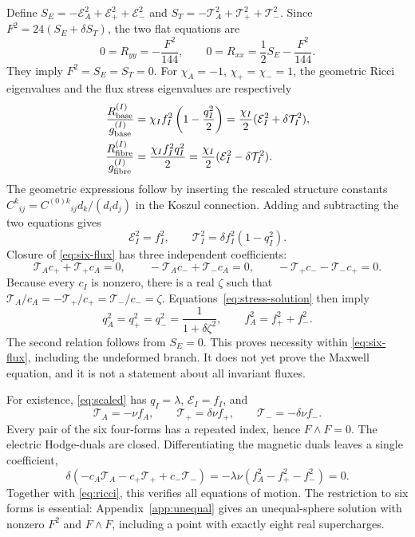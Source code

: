 Define $S_E=-\mathcal E_A^2+\mathcal E_+^2+\mathcal E_-^2$ and $S_T=-\mathcal T_A^2+\mathcal T_+^2+\mathcal T_-^2$. Since $F^2=24(S_E+\delta S_T)$, the two flat equations are
\begin{equation}
0=R_{yy}=-\frac{F^2}{144},\qquad
0=R_{xx}=\frac12S_E-\frac{F^2}{144}.
\label{eq:flat-equations}
\end{equation}
They imply $F^2=S_E=S_T=0$. For $\chi_A=-1$, $\chi_+=\chi_-=1$, the geometric Ricci eigenvalues and the flux stress eigenvalues are respectively
\begin{align}
\frac{R^{(I)}_{\rm base}}{g^{(I)}_{\rm base}}
&=\chi_If_I^2\left(1-\frac{q_I^2}{2}\right)
=\frac{\chi_I}{2}(\mathcal E_I^2+\delta\mathcal T_I^2),\notag\\
\frac{R^{(I)}_{\rm fibre}}{g^{(I)}_{\rm fibre}}
&=\frac{\chi_If_I^2q_I^2}{2}
=\frac{\chi_I}{2}(\mathcal E_I^2-\delta\mathcal T_I^2).
\label{eq:ricci}
\end{align}
The geometric expressions follow by inserting the rescaled structure constants $C^k{}_{ij}=C^{(0)k}{}_{ij}d_k/(d_id_j)$ in the Koszul connection. Adding and subtracting the two equations gives
\begin{equation}
\mathcal E_I^2=f_I^2,\qquad
\mathcal T_I^2=\delta f_I^2(1-q_I^2).
\label{eq:stress-solution}
\end{equation}
Closure of \eqref{eq:six-flux} has three independent coefficients:
\begin{equation}
\mathcal T_Ac_++\mathcal T_+c_A=0,\qquad
-\mathcal T_Ac_-+\mathcal T_-c_A=0,\qquad
-\mathcal T_+c_--\mathcal T_-c_+=0.
\label{eq:six-bianchi}
\end{equation}
Because every $c_I$ is nonzero, there is a real $\zeta$ such that
$\mathcal T_A/c_A=-\mathcal T_+/c_+=\mathcal T_-/c_-=\zeta$. Equations~\eqref{eq:stress-solution} then imply
\begin{equation}
q_A^2=q_+^2=q_-^2=\frac1{1+\delta\zeta^2},\qquad
f_A^2=f_+^2+f_-^2.
\label{eq:squash-necessity}
\end{equation}
The second relation follows from $S_E=0$. This proves necessity within \eqref{eq:six-flux}, including the undeformed branch. It does not yet prove the Maxwell equation, and it is not a statement about all invariant fluxes.

For existence, \eqref{eq:scaled} has $q_I=\lambda$, $\mathcal E_I=f_I$, and
\begin{equation}
\mathcal T_A=-\nu f_A,\qquad
\mathcal T_+=\delta\nu f_+,\qquad
\mathcal T_-=-\delta\nu f_-.
\label{eq:magnetic-amplitudes}
\end{equation}
Every pair of the six four-forms has a repeated index, hence $F\wedge F=0$. The electric Hodge-duals are closed. Differentiating the magnetic duals leaves a single coefficient,
\begin{equation}
\delta(-c_A\mathcal T_A-c_+\mathcal T_++c_-\mathcal T_-)
=-\lambda\nu(f_A^2-f_+^2-f_-^2)=0.
\label{eq:maxwell-coefficient}
\end{equation}
Together with \eqref{eq:ricci}, this verifies all equations of motion. The restriction to six forms is essential: Appendix~\ref{app:unequal} gives an unequal-sphere solution with nonzero $F^2$ and $F\wedge F$, including a point with exactly eight real supercharges.
